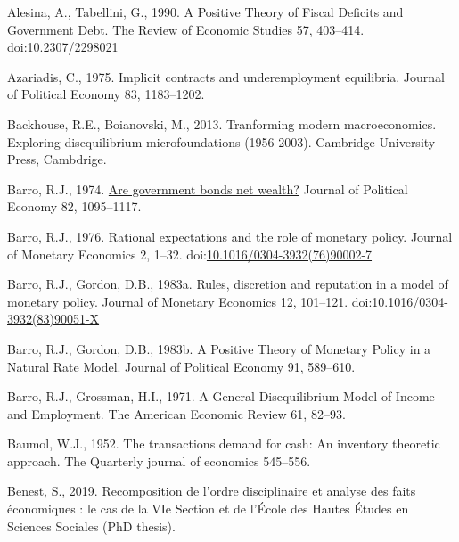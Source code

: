 \documentclass[]{elsarticle} %
\newlength{\cslhangindent}
\newlength{\cslentryspacingunit} %
\newenvironment{CSLReferences}[2] %
 {%
  \setlength{\parindent}{0pt}
  \ifodd #1
  \let\oldpar\par
  \def\par{\hangindent=\cslhangindent\oldpar}
  \fi
  \setlength{\parskip}{#2\cslentryspacingunit}
 }%
 {}
\begin{document}
\hypertarget{refs}{}
\begin{CSLReferences}{1}{0}
\leavevmode{}%
Alesina, A., Tabellini, G., 1990. A {Positive Theory} of {Fiscal
Deficits} and {Government Debt}. The Review of Economic Studies 57,
403--414. doi:\href{https://doi.org/10.2307/2298021}{10.2307/2298021}

\leavevmode{}%
Azariadis, C., 1975. Implicit contracts and underemployment equilibria.
Journal of Political Economy 83, 1183--1202.

\leavevmode{}%
Backhouse, R.E., Boianovski, M., 2013. Tranforming modern
macroeconomics. {Exploring} disequilibrium microfoundations (1956-2003).
{Cambridge University Press}, {Cambdrige}.

\leavevmode{}%
Barro, R.J., 1974. \href{http://www.jstor.org/stable/1830663}{Are
government bonds net wealth?} Journal of Political Economy 82,
1095--1117.

\leavevmode{}%
Barro, R.J., 1976. Rational expectations and the role of monetary
policy. Journal of Monetary Economics 2, 1--32.
doi:\href{https://doi.org/10.1016/0304-3932(76)90002-7}{10.1016/0304-3932(76)90002-7}

\leavevmode{}%
Barro, R.J., Gordon, D.B., 1983a. Rules, discretion and reputation in a
model of monetary policy. Journal of Monetary Economics 12, 101--121.
doi:\href{https://doi.org/10.1016/0304-3932(83)90051-X}{10.1016/0304-3932(83)90051-X}

\leavevmode{}%
Barro, R.J., Gordon, D.B., 1983b. A {Positive Theory} of {Monetary
Policy} in a {Natural Rate Model}. Journal of Political Economy 91,
589--610.

\leavevmode{}%
Barro, R.J., Grossman, H.I., 1971. A {General Disequilibrium Model} of
{Income} and {Employment}. The American Economic Review 61, 82--93.

\leavevmode{}%
Baumol, W.J., 1952. The transactions demand for cash: {An} inventory
theoretic approach. The Quarterly journal of economics 545--556.

\leavevmode{}%
Benest, S., 2019. Recomposition de l'ordre disciplinaire et analyse des
faits économiques : le cas de la VIe Section et de l'École des Hautes
Études en Sciences Sociales (PhD thesis).


\end{CSLReferences}
\end{document}
